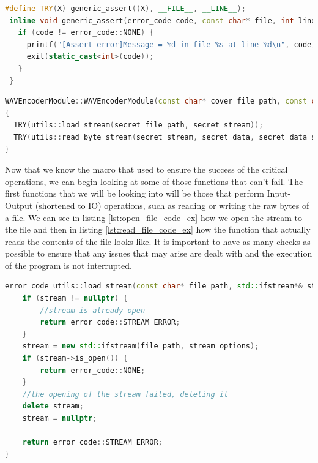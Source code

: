 \vspace{1cm}
\begin{lstlisting}[language=C++, caption=The TRY macro used for any critical operation,label={lst:try_macro}]
 #define TRY(X) generic_assert((X), __FILE__, __LINE__);
 inline void generic_assert(error_code code, const char* file, int line) {
   if (code != error_code::NONE) {
     printf("[Assert error]Message = %d in file %s at line %d\n", code, file, line);
     exit(static_cast<int>(code));
   }
 }
\end{lstlisting}
\clearpage
\begin{lstlisting}[language=C++, caption=Usage example of the TRY macro,label={lst:try_macro_example}]
WAVEncoderModule::WAVEncoderModule(const char* cover_file_path, const char* secret_file_path) : WAVModule(cover_file_path) 
{
  TRY(utils::load_stream(secret_file_path, secret_stream));
  TRY(utils::read_byte_stream(secret_stream, secret_data, secret_data_size));
}
\end{lstlisting}

Now that we know the macro that used to ensure the success of the critical operations, we can begin looking at some of those functions that can't fail. The first functions that we will be looking into will be those that perform Input-Output (shortened to IO) operations, such as reading or writing the raw bytes of a file. We can see in listing \ref{lst:open_file_code_ex} how we open the stream to the file and then in listing \ref{lst:read_file_code_ex} how the function that actually reads the contents of the file looks like. It is important to have as many checks as possible to ensure that any issues that may arise are dealt with and the execution of the program is not interrupted. 

\begin{lstlisting}[language=C++, caption=The TRY macro used for any critical operation,label={lst:open_file_code_ex}]
error_code utils::load_stream(const char* file_path, std::ifstream*& stream, std::ios_base::openmode stream_options) {
	if (stream != nullptr) {
		//stream is already open
		return error_code::STREAM_ERROR;
	}
	stream = new std::ifstream(file_path, stream_options);
	if (stream->is_open()) {
		return error_code::NONE;
	}
	//the opening of the stream failed, deleting it
	delete stream;
	stream = nullptr;

	return error_code::STREAM_ERROR;
}
\end{lstlisting}

